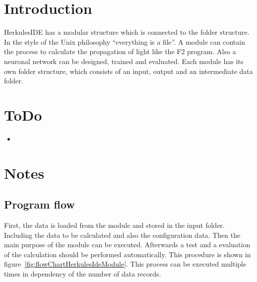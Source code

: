 \documentclass[
10pt, %
a4paper, %
onecolumn
portrait
]{article}
\begin{document}
\pagestyle{myheadings} %
\markright{\doctitle} %


\thispagestyle{plain} %

\printtitle %

\section{Introduction}
HerkulesIDE has a modular structure which is connected to the folder structure. In the style of the Unix philosophy ``everything is a file''.
A module can contain the process to calculate the propagation of light like the F2 program. Also a neuronal network can be designed, trained and evaluated.
Each module has its own folder structure, which consists of an input, output and an intermediate data folder.


\section{ToDo}
\begin{itemize}
	\item 
\end{itemize}

\FloatBarrier
\newpage
\section{Notes} %


\FloatBarrier
\subsection{Program flow}
First, the data is loaded from the module and stored in the input folder. Including the data to be calculated and also the configuration data. Then the main purpose of the module can be executed. Afterwards a test and a evaluation of the calculation should be performed automatically. This procedure is shown in figure~\ref{fig:flowChartHerkulesIdeModule}.
This process can be executed multiple times in dependency of the number of data records.
\end{document}
